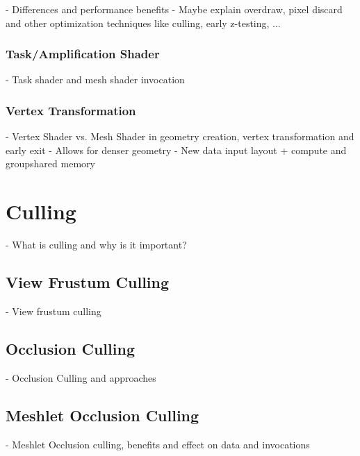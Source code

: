 - Differences and performance benefits
- Maybe explain overdraw, pixel discard and other optimization techniques like culling, early z-testing, ...

\subsubsection{Task/Amplification Shader} \label{subsec-task-shader}

- Task shader and mesh shader invocation %

\subsubsection{Vertex Transformation} \label{subsec-vertex-transformation}

- Vertex Shader vs. Mesh Shader in geometry creation, vertex transformation and early exit
- Allows for denser geometry 
- New data input layout + compute and groupshared memory

\section{Culling} \label{subsec-culling}

- What is culling and why is it important?

\subsection{View Frustum Culling} \label{subsubsec-view-frustum-culling}

- View frustum culling

\subsection{Occlusion Culling} \label{subsubsec-occ-culling}

- Occlusion Culling and approaches

\subsection{Meshlet Occlusion Culling} \label{subsubsec-meshlet-occ-culling}

- Meshlet Occlusion culling, benefits and effect on data and invocations


